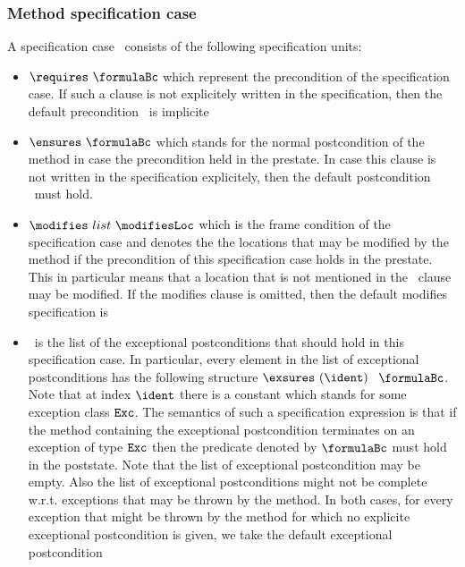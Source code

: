 \subsubsection{Method specification case}
A specification case \specCase \  consists of the following specification units:

 \begin{itemize}
      \item $\requires \ \formulaBc$ which represent the   precondition of the specification case. If such a clause is not explicitely written
            in the specification, then the default precondition  \Mytrue \ is implicite
      \item $\ensures \ \formulaBc$   which stands for the normal postcondition of the method in case the precondition held in the prestate.
            In case this clause is not written in the specification explicitely, then the default postcondition   \Mytrue \  must hold.
      \item $\modifies \ list \ \modifiesLoc $   which is the frame condition of the specification case and denotes the 
            the locations that may be modified by the method if the precondition of this specification case holds in the prestate.
	    This in particular means that a location that is not mentioned in the \modifies \  clause may be modified. 
	    If the modifies clause is omitted, then the default modifies specification is \modifies \ \everything
      \item \exsuresList \  is the list of the exceptional postconditions that should hold in this specification case. In particular,
            every element in the list of exceptional postconditions has the following structure 
	    $ \exsures \ ( \ident )  $ $\ \formulaBc$. 
	    Note that  at index $\ident$  there is a constant which stands for some exception class  $\mbox{\rm\texttt{Exc}}$.
	    The semantics of such a specification expression is that if the method 
	    containing the exceptional postcondition terminates on an exception of type   $\mbox{\rm\texttt{Exc}}$
	    then the predicate denoted by $\formulaBc$ must hold in the poststate. Note that the list of exceptional postcondition may be empty.
	    Also the list of exceptional postconditions might not be complete w.r.t. exceptions that may be thrown  by the method.
	    In both cases, for every
	    exception that might be thrown by the method for which no explicite exceptional postcondition is given,
	     we take the default exceptional postcondition
	    \Myfalse
\end{itemize}
